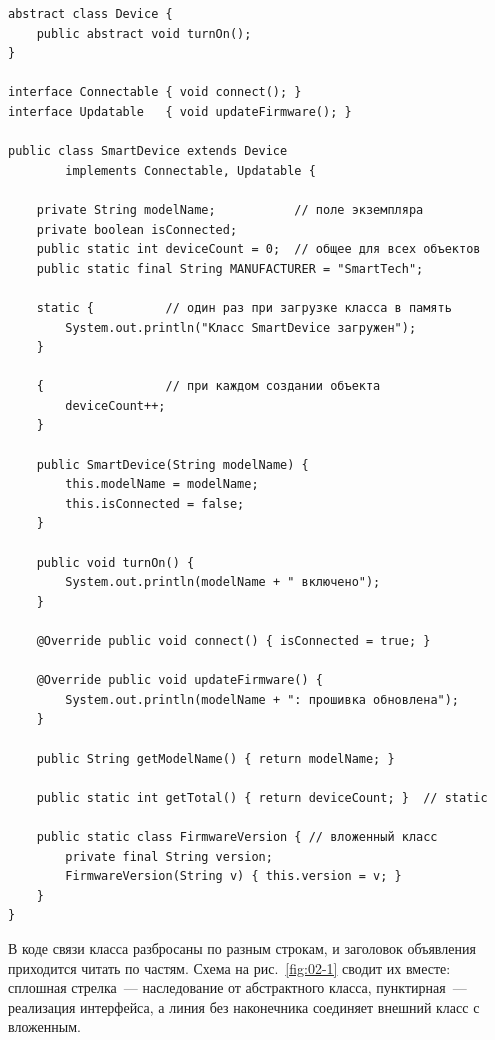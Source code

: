 \begin{listing}[H]
\begin{verbatim}
abstract class Device {
    public abstract void turnOn();
}

interface Connectable { void connect(); }
interface Updatable   { void updateFirmware(); }

public class SmartDevice extends Device
        implements Connectable, Updatable {

    private String modelName;           // поле экземпляра
    private boolean isConnected;
    public static int deviceCount = 0;  // общее для всех объектов
    public static final String MANUFACTURER = "SmartTech";

    static {          // один раз при загрузке класса в память
        System.out.println("Класс SmartDevice загружен");
    }

    {                 // при каждом создании объекта
        deviceCount++;
    }

    public SmartDevice(String modelName) {
        this.modelName = modelName;
        this.isConnected = false;
    }

    public void turnOn() {
        System.out.println(modelName + " включено");
    }

    @Override public void connect() { isConnected = true; }

    @Override public void updateFirmware() {
        System.out.println(modelName + ": прошивка обновлена");
    }

    public String getModelName() { return modelName; }

    public static int getTotal() { return deviceCount; }  // static

    public static class FirmwareVersion { // вложенный класс
        private final String version;
        FirmwareVersion(String v) { this.version = v; }
    }
}
\end{verbatim}
\caption{Класс со всеми основными видами элементов}
\label{lst:02-1}
\end{listing}

В коде связи класса разбросаны по разным строкам, и заголовок объявления
приходится читать по частям. Схема на рис.~\ref{fig:02-1} сводит их вместе:
сплошная стрелка~--- наследование от абстрактного класса, пунктирная~---
реализация интерфейса, а линия без наконечника соединяет внешний класс с
вложенным.

